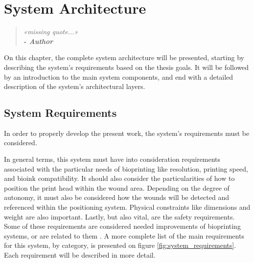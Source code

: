 \chapter{System Architecture}
\label{cha:system_architecture}

\begin{quotation}
\begin{flushright}
\itshape
«missing quote...»\\
\textbf{- Author}
\end{flushright}
\end{quotation}

On this chapter, the complete system architecture will be presented, starting by describing the system's requirements based on the thesis goals. It will be followed by an introduction to the main system components, and end with a detailed description of the system's architectural layers.


\section{System Requirements}
\label{sec:system_architecture_requirements}

In order to properly develop the present work, the system's requirements must be considered.

In general terms, this system must have into consideration requirements associated with the particular needs of bioprinting like resolution, printing speed, and bioink compatibility. It should also consider the particularities of how to position the print head within the wound area. Depending on the degree of autonomy, it must also be considered how the wounds will be detected and referenced within the positioning system. Physical constraints like dimensions and weight are also important. Lastly, but also vital, are the safety requirements. Some of these requirements are considered needed improvements of bioprinting systems, or are related to them \cite{Ozbolat2017_evaluation_bioprinter_tech}. A more complete list of the main requirements for this system, by category, is presented on figure \ref{fig:system_requirements}. Each requirement will be described in more detail.

